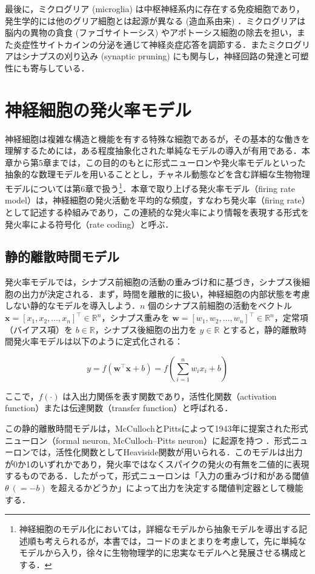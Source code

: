 \documentclass[titlepage]{ltjsbook}
\begin{document}
最後に，ミクログリア (microglia) は中枢神経系内に存在する免疫細胞であり，発生学的には他のグリア細胞とは起源が異なる (造血系由来) ．ミクログリアは脳内の異物の貪食 (ファゴサイトーシス) やアポトーシス細胞の除去を担い，また炎症性サイトカインの分泌を通じて神経炎症応答を調節する．またミクログリアはシナプスの刈り込み (synaptic pruning) にも関与し，神経回路の発達と可塑性にも寄与している．

\section{神経細胞の発火率モデル}
神経細胞は複雑な構造と機能を有する特殊な細胞であるが，その基本的な働きを理解するためには，ある程度抽象化された単純なモデルの導入が有用である．本章から第5章までは，この目的のもとに形式ニューロンや発火率モデルといった抽象的な数理モデルを用いることとし，チャネル動態などを含む詳細な生物物理モデルについては第6章で扱う\footnote{神経細胞のモデル化においては，詳細なモデルから抽象モデルを導出する記述順も考えられるが，本書では，コードのまとまりを考慮して，先に単純なモデルから入り，徐々に生物物理学的に忠実なモデルへと発展させる構成とする．}．本章で取り上げる発火率モデル（firing rate model）は，神経細胞の発火活動を平均的な頻度，すなわち発火率（firing rate）として記述する枠組みであり，この連続的な発火率により情報を表現する形式を発火率による符号化（rate coding）と呼ぶ．

\subsection{静的離散時間モデル}
発火率モデルでは，シナプス前細胞の活動の重みづけ和に基づき，シナプス後細胞の出力が決定される．まず，時間を離散的に扱い，神経細胞の内部状態を考慮しない静的なモデルを導入しよう．$n$ 個のシナプス前細胞の活動をベクトル $\mathbf{x} = [x_1, x_2, \dots, x_n]^\top \in \mathbb{R}^n$，シナプス重みを $\mathbf{w} = [w_1, w_2, \dots, w_n]^\top \in \mathbb{R}^n$，定常項（バイアス項）を $b \in \mathbb{R}$，シナプス後細胞の出力を $y \in \mathbb{R}$ とすると，静的離散時間発火率モデルは以下のように定式化される：

\begin{equation}
y = f(\mathbf{w}^\top \mathbf{x} + b) = f\left(\sum_{i=1}^n w_i x_i + b\right)
\end{equation}

ここで，$f(\cdot)$ は入出力関係を表す関数であり，活性化関数（activation function）または伝達関数（transfer function）と呼ばれる．

この静的離散時間モデルは，McCullochとPittsによって1943年に提案された形式ニューロン（formal neuron, McCulloch–Pitts neuron）に起源を持つ \citep{mcculloch1943logical}．形式ニューロンでは，活性化関数としてHeaviside関数が用いられる．このモデルは出力が0か1のいずれかであり，発火率ではなくスパイクの発火の有無を二値的に表現するものである．したがって，形式ニューロンは「入力の重みづけ和がある閾値 $\theta \ (=-b)$ を超えるかどうか」によって出力を決定する閾値判定器として機能する．
\end{document}

